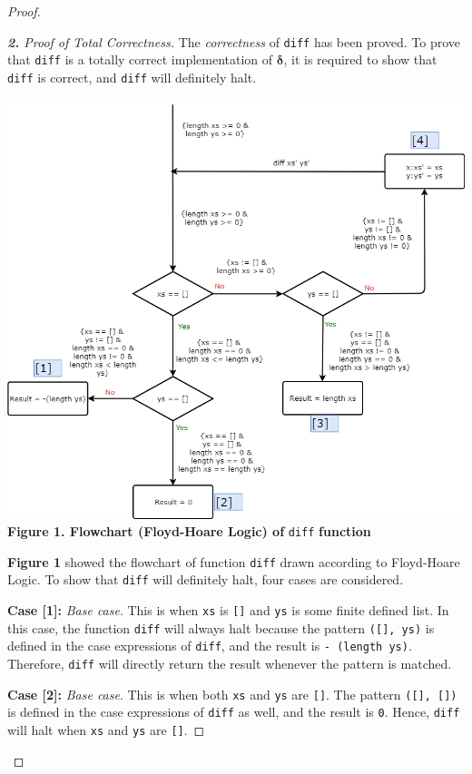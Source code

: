 \documentclass[12pt]{article}
\newcommand{\haskell}{\texttt}
\begin{document}
\begin{proof}
\newpage\begin{proof}[\textbf{2.} Proof of Total Correctness]
The \emph{correctness} of \haskell{diff} has been proved. To prove that \haskell{diff} is a totally correct implementation of $\bm{\delta}$, it is required to show that \haskell{diff} is correct, and \haskell{diff} will definitely halt.
\begin{mdframed}
  \begin{center}
    \includegraphics[width=15.7cm]{flowchart.png}
    \textbf{Figure 1. Flowchart (Floyd-Hoare Logic) of} \haskell{diff} \textbf{function}
  \end{center}
\end{mdframed}

\textbf{Figure 1} showed the flowchart of function \haskell{diff} drawn according to Floyd-Hoare Logic. To show that \haskell{diff} will definitely halt, four cases are considered.

\par\noindent \textbf{Case [1]:} \emph{Base case}. This is when \haskell{xs} is \haskell{[]} and \haskell{ys} is some finite defined list. In this case, the function \haskell{diff} will always halt because the pattern \haskell{([], ys)} is defined in the  case expressions of \haskell{diff}, and the result is \haskell{- (length ys)}. Therefore, \haskell{diff} will directly return the result whenever the pattern is matched.

\bigskip\par\noindent \textbf{Case [2]:} \emph{Base case}. This is when both \haskell{xs} and \haskell{ys} are \haskell{[]}. The pattern \haskell{([], [])} is defined in the case expressions of \haskell{diff} as well, and the result is \haskell{0}. Hence, \haskell{diff} will halt when \haskell{xs} and \haskell{ys} are \haskell{[]}.


\end{proof}
\end{proof}
\end{document}
